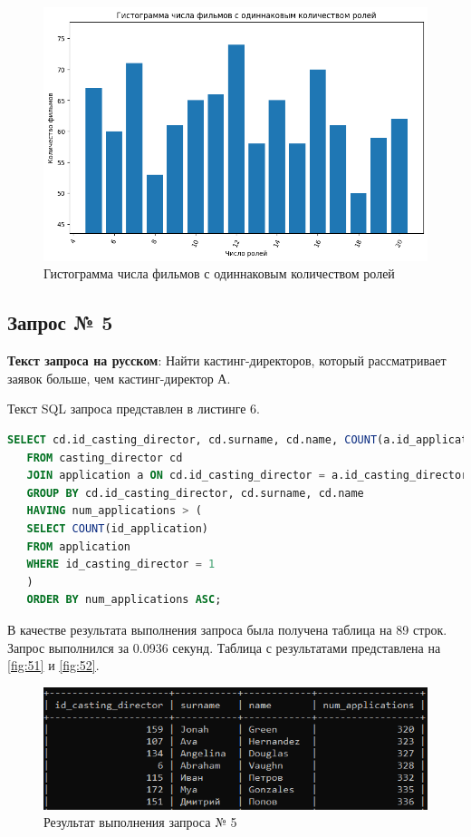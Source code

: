 \documentclass[11pt,a4paper,final]{article} %
\begin{document}
\begin{figure}[H]
	\centering
	\includegraphics[width=0.7\linewidth]{g4.png}
	\caption{Гистограмма числа фильмов с одиннаковым количеством ролей}
	\label{fig:g4}
\end{figure}


\subsection{Запрос № 5}

\par \textbf{Текст запроса на русском}: Найти кастинг-директоров, который рассматривает заявок больше, чем кастинг-директор А.  
\par Текст SQL запроса представлен в листинге 6.

\begin{lstlisting}[caption=SQL запрос № 5, language=SQL]
   SELECT cd.id_casting_director, cd.surname, cd.name, COUNT(a.id_application) AS num_applications
   FROM casting_director cd
   JOIN application a ON cd.id_casting_director = a.id_casting_director
   GROUP BY cd.id_casting_director, cd.surname, cd.name
   HAVING num_applications > (
   SELECT COUNT(id_application)
   FROM application
   WHERE id_casting_director = 1
   )
   ORDER BY num_applications ASC;
\end{lstlisting}


\par В качестве результата выполнения запроса была получена таблица на 89 строк. Запрос выполнился за 0.0936 секунд. Таблица с результатами представлена на \autoref{fig:51} и \autoref{fig:52}.

\newpage
\begin{figure}[H]
	\centering
	\includegraphics[width=0.7\linewidth]{51.png}
	\caption{Результат выполнения запроса № 5}
	\label{fig:51}
\end{figure}
\end{document}
